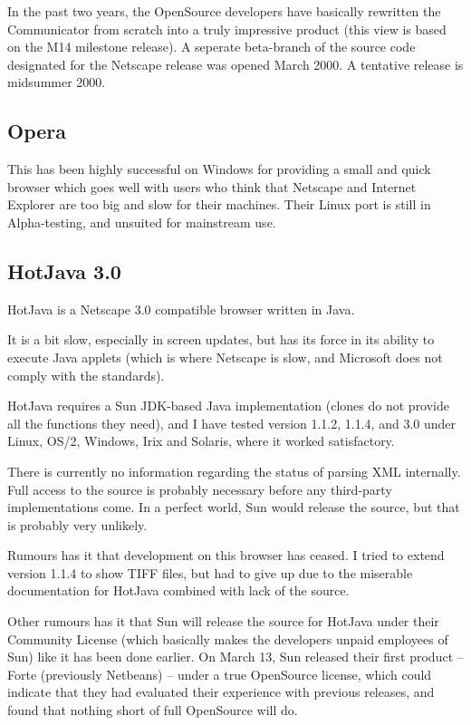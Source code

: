 In the past two years, the OpenSource developers have basically
rewritten the Communicator from scratch into a truly impressive
product (this view is based on the M14 milestone release).  A seperate
beta-branch of the source code designated for the Netscape release was
opened March 2000. A tentative release is midsummer 2000.

\subsection{Opera}
\label{sec:opera}

This  has been highly
successful on Windows for providing a small and quick browser which
goes well with users who think that Netscape and Internet Explorer are
too big and slow for their machines.  Their Linux port is still in
Alpha-testing, and unsuited for mainstream use.


\subsection{HotJava 3.0}
\label{sec:hotjava}

HotJava is a Netscape 3.0 compatible browser written in Java.

It is a bit slow, especially in screen updates, but has its force in
its ability to execute Java applets (which is where Netscape is slow,
and Microsoft does not comply with the standards).

HotJava requires a Sun JDK-based Java implementation (clones do not
provide all the functions they need), and I have tested version 1.1.2,
1.1.4, and 3.0 under Linux, OS/2, Windows, Irix and Solaris, where it
worked satisfactory.

There is currently no information regarding the status of parsing XML
internally.  Full access to the source is probably necessary before
any third-party implementations come.  In a perfect world, Sun would
release the source, but that is probably very unlikely.

Rumours has it that development on this browser has ceased.  I tried
to extend version 1.1.4 to show TIFF files, but had to give up due to
the miserable documentation for HotJava combined with lack of the
source.

Other rumours has it that Sun will release the source for HotJava
under their Community License (which basically makes the developers
unpaid employees of Sun) like it has been done earlier.  On March 13,
Sun released their first product -- Forte (previously Netbeans) --
under a true OpenSource license, which could indicate that they had
evaluated their experience with previous releases, and found that
nothing short of full OpenSource will do.

